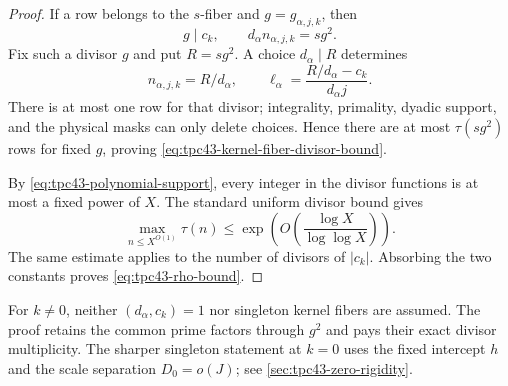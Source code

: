 \begin{proof}
If a row belongs to the \(s\)-fiber and
\(g=g_{\alpha,j,k}\), then
\begin{equation}
 g\mid c_k,
 \qquad
 d_\alpha n_{\alpha,j,k}=sg^2.
 \label{eq:tpc43-fiber-product}
\end{equation}
Fix such a divisor \(g\) and put \(R=sg^2\).  A choice
\(d_\alpha\mid R\) determines
\begin{equation}
 n_{\alpha,j,k}=R/d_\alpha,
 \qquad
 \ell_\alpha
 =\frac{R/d_\alpha-c_k}{d_\alpha j}.
 \label{eq:tpc43-row-recovery}
\end{equation}
There is at most one row for that divisor; integrality, primality,
dyadic support, and the physical masks can only delete choices.  Hence
there are at most \(\tau(sg^2)\) rows for fixed \(g\), proving
\eqref{eq:tpc43-kernel-fiber-divisor-bound}.

By \eqref{eq:tpc43-polynomial-support}, every integer in the divisor
functions is at most a fixed power of \(X\).  The standard uniform
divisor bound gives \citep[Chapter~I]{IwaniecKowalski2004}
\begin{equation}
 \max_{n\le X^{O(1)}}\tau(n)
 \le\exp\!\left(O\!\left(\frac{\log X}{\log\log X}\right)\right).
 \label{eq:tpc43-uniform-divisor-bound}
\end{equation}
The same estimate applies to the number of divisors of \(|c_k|\).
Absorbing the two constants proves \eqref{eq:tpc43-rho-bound}.
\end{proof}

\begin{remark}
\label{rem:tpc43-alias-collisions}
For \(k\ne0\), neither \((d_\alpha,c_k)=1\) nor singleton kernel fibers
are assumed.  The proof retains the common prime factors through
\(g^2\) and pays their exact divisor multiplicity.  The sharper singleton
statement at \(k=0\) uses the fixed intercept \(h\) and the scale
separation \(D_0=o(J)\); see \cref{sec:tpc43-zero-rigidity}.
\end{remark}
